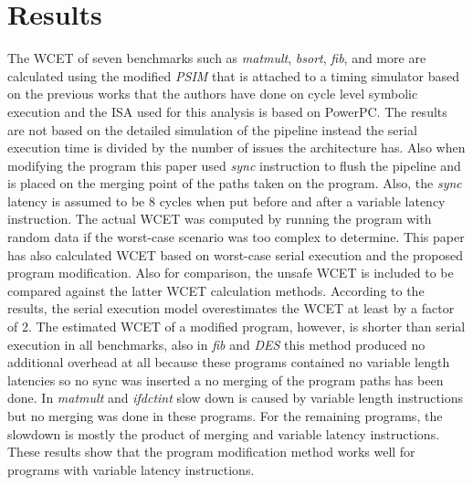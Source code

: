 \documentclass[a4paper, 11pt]{article}
\begin{document}
\section{Results}
The WCET of seven benchmarks such as \textit{matmult}, \textit{bsort}, 
\textit{fib}, and more are calculated using the modified \textit{PSIM} that is
attached to a timing simulator based on the previous works that the authors
have done on cycle level symbolic execution and the ISA used for this analysis
is based on PowerPC. The results are not based on the detailed simulation of 
the pipeline instead the serial execution time is divided by the number of 
issues the architecture has. Also when modifying the program this paper used
\textit{sync} instruction to flush the pipeline and is placed on the merging
point of the paths taken on the program. Also, the \textit{sync} latency is 
assumed to be 8 cycles when put before and after a variable latency 
instruction. The actual WCET was computed by running the program with random 
data if the worst-case scenario was too complex to determine. This paper has
also calculated WCET based on worst-case serial execution and the proposed
program modification. Also for comparison, the unsafe WCET is included to be 
compared against the latter WCET calculation methods.
According to the results, the serial execution model overestimates the WCET at
least by a factor of 2. The estimated WCET of a modified program, however, is 
shorter than serial execution in all benchmarks, also in \textit{fib} and
\textit{DES} this method produced no additional overhead at all because these
programs contained no variable length latencies so no sync was inserted a no 
merging of the program paths has been done. In \textit{matmult} and 
\textit{ifdctint} slow down is caused by variable length instructions but no 
merging was done in these programs. For the remaining programs, the slowdown is 
mostly the product of merging and variable latency instructions. These results
show that the program modification method works well for programs with 
variable latency instructions.
\end{document}
